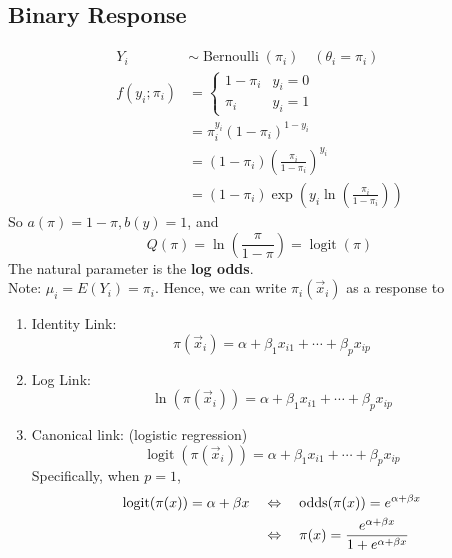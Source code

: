 \documentclass[11pt]{elegantbook}
\begin{document}
\subsection{Binary Response}
\begin{example}
    \begin{equation}
        \begin{aligned}
        Y_i & \sim \operatorname{Bernoulli}\left(\pi_i\right) \quad\left(\theta_i=\pi_i\right) \\
        f\left(y_i ; \pi_i\right) & = \left\{\begin{matrix}
            1-\pi_i & y_i=0 \\
            \pi_i & y_i=1
        \end{matrix}\right.\\
        & =\pi_i^{y_i}\left(1-\pi_i\right)^{1-y_i} \\
        & =\left(1-\pi_i\right)\left(\frac{\pi_i}{1-\pi_i}\right)^{y_i} \\
        & =\left(1-\pi_i\right) \exp \left(y_i \ln \left(\frac{\pi_i}{1-\pi_i}\right)\right)
        \end{aligned}
        \nonumber
    \end{equation}
    So $a(\pi)=1-\pi, b(y)=1$, and
    $$
    Q(\pi)=\ln \left(\frac{\pi}{1-\pi}\right)=\operatorname{logit}(\pi)
    $$
    The natural parameter is the \textbf{log odds}.\\
    Note: $\mu_i=E\left(Y_i\right)=\pi_i$. Hence, we can write $\pi_i(\vec{x}_i)$ as a response to
    \begin{enumerate}[$\bullet$]
        \item Identity Link: $$\pi(\vec{x}_i)=\alpha+\beta_1 x_{i1} + \cdots + \beta_p x_{ip}$$
        \item Log Link: $$\ln (\pi(\vec{x}_i))=\alpha+\beta_1 x_{i1} + \cdots + \beta_p x_{ip}$$
        \item Canonical link: (logistic regression)
        $$
        \operatorname{logit}(\pi(\vec{x}_i))=\alpha+\beta_1 x_{i1} + \cdots + \beta_p x_{ip}
        $$
        Specifically, when $p=1$,
        \begin{equation}
            \begin{aligned}
                \operatorname{logit}(\pi(x))=\alpha+\beta x\quad &\Leftrightarrow\quad \textnormal{odds}(\pi(x))=e^{\alpha+\beta x}\\
                &\Leftrightarrow\quad \pi(x)=\frac{e^{\alpha+\beta x}}{1+e^{\alpha+\beta x}}
            \end{aligned}
            \nonumber
        \end{equation}
    \end{enumerate}
\end{example}
\end{document}
